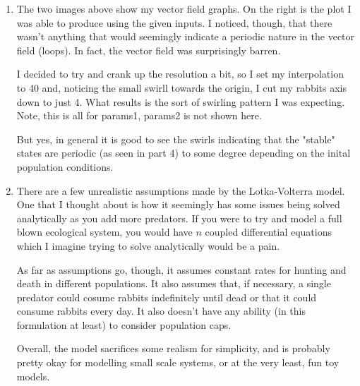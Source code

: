 \documentclass[11pt]{article}
\begin{document}
\begin{enumerate}
        \item The two images above show my vector field graphs. On the right is
            the plot I was able to produce using the given inputs. I noticed,
            though, that there wasn't anything that would seemingly indicate a
            periodic nature in the vector field (loops). In fact, the vector
            field was surprisingly barren.

            I decided to try and crank up the resolution a bit, so I set my
            interpolation to 40 and, noticing the small swirll towards the
            origin, I cut my rabbits axis down to just 4. What results is the
            sort of swirling pattern I was expecting. Note, this is all for
            params1, params2 is not shown here.

            But yes, in general it is good to see the swirls indicating that
            the "stable" states are periodic (as seen in part 4) to some degree depending on the
            inital population conditions.

        \item There are a few unrealistic assumptions made by the
            Lotka-Volterra model. One that I thought about is how it seemingly
            has some issues being solved analytically as you add more
            predators. If you were to try and model a full blown ecological
            system, you would have $n$ coupled differential equations which I
            imagine trying to solve analytically would be a pain.

            As far as assumptions go, though, it assumes constant rates for
            hunting and death in different populations. It also assumes that,
            if necessary, a single predator could cosume rabbits indefinitely
            until dead or that it could consume rabbits every day. It also
            doesn't have any ability (in this formulation at least) to consider
            population caps.

            Overall, the model sacrifices some realism for simplicity, and is
            probably pretty okay for modelling small scale systems, or at the
            very least, fun toy models.


\end{enumerate}
\end{document}
